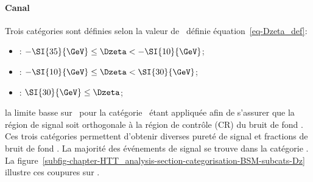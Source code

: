 \paragraph{Canal \ele\mu}
Trois catégories sont définies selon la valeur de \Dzeta\ définie équation~\eqref{eq-Dzeta_def}:
\begin{itemize}
\item \CATlowdz: $-\SI{35}{\GeV} \leq \Dzeta < -\SI{10}{\GeV}$;
\item \CATmediumdz: $-\SI{10}{\GeV} \leq \Dzeta < \SI{30}{\GeV}$;
\item \CAThighdz: $\SI{30}{\GeV} \leq \Dzeta$;
\end{itemize}
la limite basse sur \Dzeta\ pour la catégorie \CATlowdz\ étant appliquée afin de s'assurer que la région de signal soit orthogonale à la région de contrôle (CR) du bruit de fond \ttbar.
Ces trois catégories permettent d'obtenir diverses pureté de signal et fractions de bruit de fond \ttbar.
La majorité des événements de signal se trouve dans la catégorie \CATmediumdz.
La figure~\ref{subfig-chapter-HTT_analysis-section-categorisation-BSM-subcats-Dz} illustre ces coupures sur \Dzeta.
